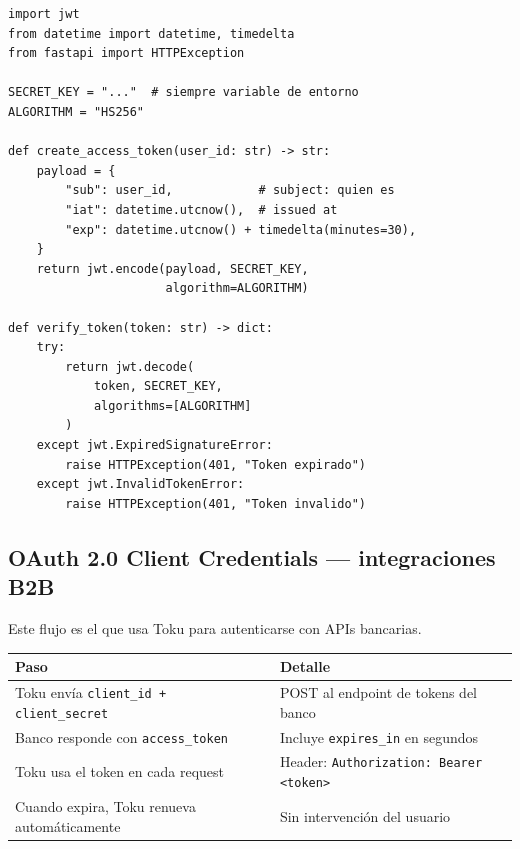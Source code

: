 \documentclass[11pt,a4paper]{article}
\begin{document}
\begin{pybox}
\begin{lstlisting}[style=python]
import jwt
from datetime import datetime, timedelta
from fastapi import HTTPException

SECRET_KEY = "..."  # siempre variable de entorno
ALGORITHM = "HS256"

def create_access_token(user_id: str) -> str:
    payload = {
        "sub": user_id,            # subject: quien es
        "iat": datetime.utcnow(),  # issued at
        "exp": datetime.utcnow() + timedelta(minutes=30),
    }
    return jwt.encode(payload, SECRET_KEY,
                      algorithm=ALGORITHM)

def verify_token(token: str) -> dict:
    try:
        return jwt.decode(
            token, SECRET_KEY,
            algorithms=[ALGORITHM]
        )
    except jwt.ExpiredSignatureError:
        raise HTTPException(401, "Token expirado")
    except jwt.InvalidTokenError:
        raise HTTPException(401, "Token invalido")
\end{lstlisting}
\end{pybox}

\subsection{OAuth 2.0 Client Credentials — integraciones B2B}

Este flujo es el que usa Toku para autenticarse con APIs bancarias.

\begin{center}
\begin{tabular}{p{6cm} p{6cm}}
\toprule
\textbf{Paso} & \textbf{Detalle} \\
\midrule
Toku envía \texttt{client\_id + client\_secret}
  & POST al endpoint de tokens del banco \\
Banco responde con \texttt{access\_token}
  & Incluye \texttt{expires\_in} en segundos \\
Toku usa el token en cada request
  & Header: \texttt{Authorization: Bearer <token>} \\
Cuando expira, Toku renueva automáticamente
  & Sin intervención del usuario \\
\bottomrule
\end{tabular}
\end{center}
\end{document}
